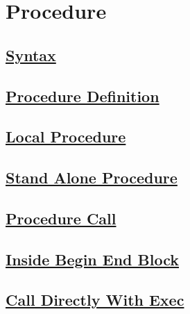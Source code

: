 \vspace{0.5cm}
\section{Procedure}

\subsection*{\underline{Syntax}}

\subsection*{\underline{Procedure Definition}}

\subsection*{\underline{Local Procedure}}





\subsection*{\underline{Stand Alone Procedure}}



\newpage
\subsection*{\underline{Procedure Call}}

\subsection*{\underline{Inside Begin End Block}}



\subsection*{\underline{Call Directly With Exec}}




